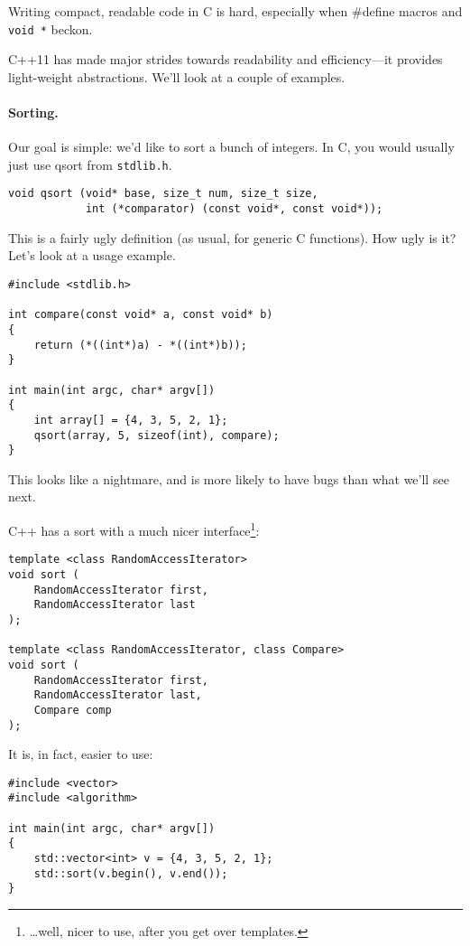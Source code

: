  Writing compact, readable code in C is hard, especially when \#define
macros and {\tt void *} beckon.

    C++11 has made major strides towards readability and
    efficiency---it provides light-weight abstractions. We'll look at
    a couple of examples.

\paragraph{Sorting.} Our goal is simple: we'd like to sort a bunch of integers.
In C, you would usually just use qsort from {\tt stdlib.h}.

  \begin{lstlisting}
void qsort (void* base, size_t num, size_t size,
            int (*comparator) (const void*, const void*));
  \end{lstlisting}

This is a fairly ugly definition (as usual, for generic C functions). How ugly is it?
Let's look at a usage example.
  \begin{lstlisting}[basicstyle=\small]
#include <stdlib.h>

int compare(const void* a, const void* b)
{
    return (*((int*)a) - *((int*)b));
}

int main(int argc, char* argv[])
{
    int array[] = {4, 3, 5, 2, 1};
    qsort(array, 5, sizeof(int), compare);
}
  \end{lstlisting}
This looks like a nightmare, and is more likely to have bugs than what we'll see next.


C++ has a sort with a much nicer interface\footnote{\ldots well, nicer to use, after you get over templates.}:

  \begin{lstlisting}[basicstyle=\small]
template <class RandomAccessIterator>
void sort (
    RandomAccessIterator first,
    RandomAccessIterator last
);

template <class RandomAccessIterator, class Compare>
void sort (
    RandomAccessIterator first,
    RandomAccessIterator last,
    Compare comp
);
  \end{lstlisting}
It is, in fact, easier to use:
  \begin{lstlisting}[basicstyle=\small]
#include <vector>
#include <algorithm>

int main(int argc, char* argv[])
{
    std::vector<int> v = {4, 3, 5, 2, 1};
    std::sort(v.begin(), v.end());
}
  \end{lstlisting}

